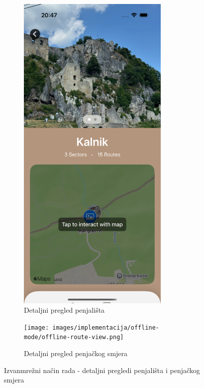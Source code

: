 \begin{figure}[H]
    \centering
    \begin{subfigure}[b]{0.4\textwidth}
        \centering
        \includegraphics[width=0.8\textwidth]{images/implementacija/offline-mode/offline-crag-view.png}
        \caption{Detaljni pregled penjališta}
        \label{fig:izvanmrezni_nacin_rada_detail_crag}
    \end{subfigure}
    \hspace{0.05\textwidth}
    \begin{subfigure}[b]{0.4\textwidth}
        \centering
        \texttt{[image: images/implementacija/offline-mode/offline-route-view.png]}
        \caption{Detaljni pregled penjačkog smjera}
        \label{fig:izvanmrezni_nacin_rada_detail_route}
    \end{subfigure}
    \caption{Izvanmrežni način rada - detaljni pregledi penjališta i penjačkog smjera}
    \label{fig:izvanmrezni_nacin_rada_detail}
\end{figure}

